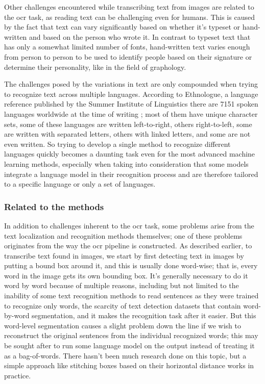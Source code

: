 Other challenges encountered while transcribing text from images are related to the \gls{ocr} task, as reading text can be challenging even for humans. This is caused by the fact that text can vary significantly based on whether it's typeset or hand-written and based on the person who wrote it. In contrast to typeset text that has only a somewhat limited number of fonts, hand-written text varies enough from person to person to be used to identify people based on their signature or determine their personality, like in the field of graphology.

The challenges posed by the variations in text are only compounded when trying to recognize text across multiple languages. According to Ethnologue, a language reference published by the Summer Institute of Linguistics there are 7151 spoken languages worldwide at the time of writing \cite{noauthor_how_2016}; most of them have unique character sets, some of these languages are written left-to-right, others right-to-left, some are written with separated letters, others with linked letters, and some are not even written. So trying to develop a single method to recognize different languages quickly becomes a daunting task even for the most advanced machine learning methods, especially when taking into consideration that some models integrate a language model in their recognition process and are therefore tailored to a specific language or only a set of languages.

\subsubsection*{Related to the methods}

In addition to challenges inherent to the \gls{ocr} task, some problems arise from the text localization and recognition methods themselves; one of these problems originates from the way the \gls{ocr} pipeline is constructed. As described earlier, to transcribe text found in images, we start by first detecting text in images by putting a bound box around it, and this is usually done word-wise; that is, every word in the image gets its own bounding box. It's generally necessary to do it word by word because of multiple reasons, including but not limited to the inability of some text recognition methods to read sentences as they were trained to recognize only words, the scarcity of text detection datasets that contain word-by-word segmentation, and it makes the recognition task after it easier. But this word-level segmentation causes a slight problem down the line if we wish to reconstruct the original sentences from the individual recognized words; this may be sought after to run some language model on the output instead of treating it as a bag-of-words. There hasn't been much research done on this topic, but a simple approach like stitching boxes based on their horizontal distance works in practice.

